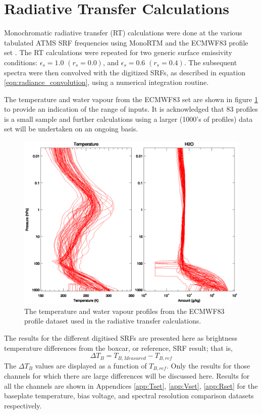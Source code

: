 \section{Radiative Transfer Calculations}
\label{sec:rt}

Monochromatic radiative transfer (RT) calculations were done at the various tabulated ATMS SRF frequencies using MonoRTM \cite{Payne_2008,Clough_2005} and the ECMWF83 profile set \cite{Matricardi_ECMWF564,ECMWF_profile_set2}. The RT calculations were repeated for two generic surface emissivity conditions: $\epsilon_s=1.0$ $(r_s=0.0)$, and $\epsilon_s=0.6$ $(r_s=0.4)$. The subsequent spectra were then convolved with the digitized SRFs, as described in equation \ref{eqn:radiance_convolution}, using a numerical integration routine.

The temperature and water vapour from the ECMWF83 set are shown in figure \ref{fig:ECMWF83.AtmProfile} to provide an indication of the range of inputs. It is acknowledged that 83 profiles is a small sample and further calculations using a larger (1000's of profiles) data set will be undertaken on an ongoing basis.

\begin{figure}[htp]
  \centering
  \includegraphics[scale=1]{graphics/atmprofile/ECMWF83.AtmProfile.eps}
  \caption{The temperature and water vapour profiles from the ECMWF83 profile dataset used in the radiative transfer calculations.}
  \label{fig:ECMWF83.AtmProfile}
\end{figure}

The results for the different digitised SRFs are presented here as brightness temperature differences from the boxcar, or reference, SRF result; that is,
\begin{equation}
  \Delta T_B = T_{B,Measured} - T_{B,ref} 
\end{equation}
The $\Delta T_B$ values are displayed as a function of $T_{B,ref}$. Only the results for those channels for which there are large differences will be discussed here. Results for all the channels are shown in Appendices \ref{app:Tset}, \ref{app:Vset}, \ref{app:Rset} for the baseplate temperature, bias voltage, and spectral resolution comparison datasets respectively.

